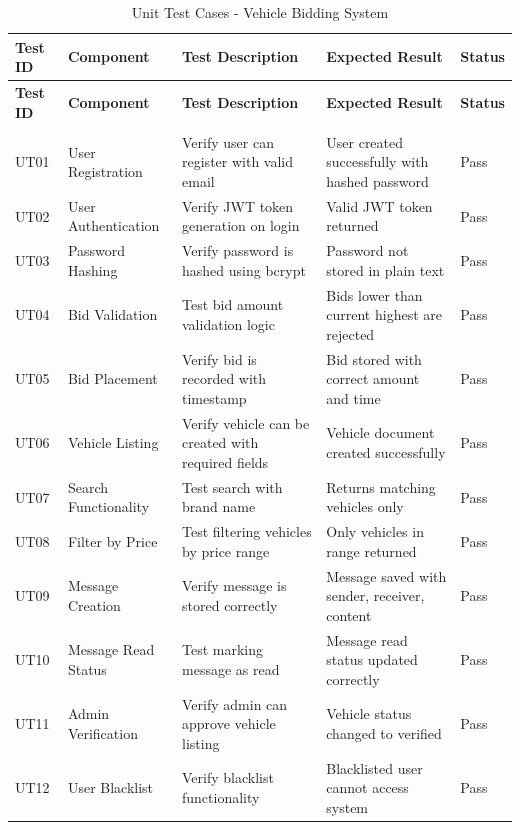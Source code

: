 \begin{longtable}{|p{1.8cm}|p{2.5cm}|p{3.5cm}|p{3cm}|p{1cm}|}
    \hline
    \textbf{Test ID} & \textbf{Component} & \textbf{Test Description} & \textbf{Expected Result} & \textbf{Status} \\
    \hline
    \endfirsthead

    \hline
    \textbf{Test ID} & \textbf{Component} & \textbf{Test Description} & \textbf{Expected Result} & \textbf{Status} \\
    \hline
    \endhead

    \hline
    \endfoot

    \hline
    \caption{Unit Test Cases - Vehicle Bidding System} \label{tab:unit_tests} \\
    \endlastfoot

    UT01 & User Registration & Verify user can register with valid email & User created successfully with hashed password & Pass \\
    \hline
    UT02 & User Authentication & Verify JWT token generation on login & Valid JWT token returned & Pass \\
    \hline
    UT03 & Password Hashing & Verify password is hashed using bcrypt & Password not stored in plain text & Pass \\
    \hline
    UT04 & Bid Validation & Test bid amount validation logic & Bids lower than current highest are rejected & Pass \\
    \hline
    UT05 & Bid Placement & Verify bid is recorded with timestamp & Bid stored with correct amount and time & Pass \\
    \hline
    UT06 & Vehicle Listing & Verify vehicle can be created with required fields & Vehicle document created successfully & Pass \\
    \hline
    UT07 & Search Functionality & Test search with brand name & Returns matching vehicles only & Pass \\
    \hline
    UT08 & Filter by Price & Test filtering vehicles by price range & Only vehicles in range returned & Pass \\
    \hline
    UT09 & Message Creation & Verify message is stored correctly & Message saved with sender, receiver, content & Pass \\
    \hline
    UT10 & Message Read Status & Test marking message as read & Message read status updated correctly & Pass \\
    \hline
    UT11 & Admin Verification & Verify admin can approve vehicle listing & Vehicle status changed to verified & Pass \\
    \hline
    UT12 & User Blacklist & Verify blacklist functionality & Blacklisted user cannot access system & Pass \\
\end{longtable}

